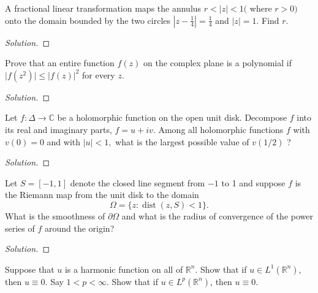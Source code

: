 \documentclass[10pt]{article}
\newenvironment{soln}{\begin{proof}[Solution]}{\end{proof}}
\providecommand{\smabs}[1]{\lvert #1\rvert}
\begin{document}
\begin{problem}
[2010 J-II-6]
A fractional linear transformation maps the annulus $r<|z|<1($ where $r>0)$ onto the domain bounded by the two circles $\left|z-\frac{1}{4}\right|=\frac{1}{4}$ and $|z|=1.$ Find $r.$
\end{problem}

\begin{soln}

\end{soln}



\begin{problem}
[2010 A-I-4]
Prove that an entire function $f(z)$ on the complex plane is a polynomial if $\smabs{f(z^2)} \leq|f(z)|^2$ for every $z.$
\end{problem}

\begin{soln}

\end{soln}



\begin{problem}
[2010 A-II-3]
Let $f: \Delta \rightarrow \mathbb{C}$ be a holomorphic function on the open unit disk. Decompose $f$ into its real and imaginary parts, $f=u+i v.$ Among all holomorphic functions $f$ with $v(0)=0$ and with $|u|<1,$ what is the largest possible value of $v(1 / 2)$ ?
\end{problem}

\begin{soln}

\end{soln}



\begin{problem}
[2009 J-I-3]
Let $S=[-1,1]$ denote the closed line segment from $-1$ to 1 and suppose $f$ is the Riemann map from the unit disk to the domain
$$
\Omega=\{z: \operatorname{dist}(z, S)<1\} .
$$
What is the smoothness of $\partial \Omega$ and what is the radius of convergence of the power series of $f$ around the origin?
\end{problem}

\begin{soln}

\end{soln}



\begin{problem}
[2009 J-I-4]
Suppose that $u$ is a harmonic function on all of $\mathbb{R}^n$. Show that if $u \in L^1\left(\mathbb{R}^n\right)$, then $u \equiv 0$. Say $1< p<\infty$. Show that if $u \in L^p\left(\mathbb{R}^n\right)$, then $u \equiv 0$.
\end{problem}
\end{document}
